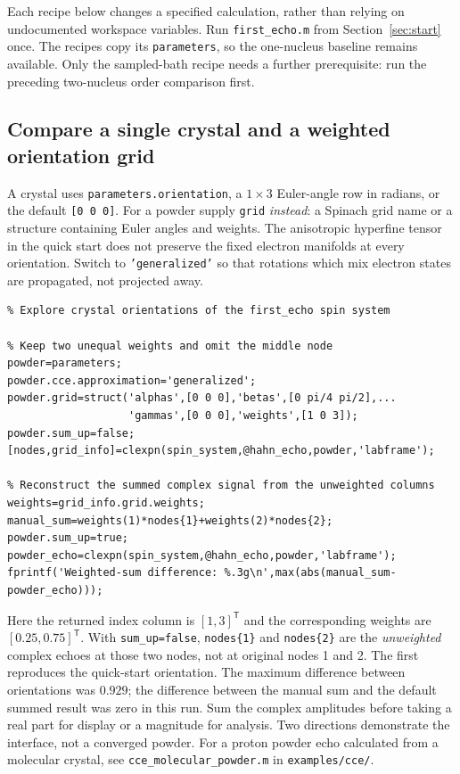 \documentclass[11pt,a4paper]{article}
\newcommand{\code}[1]{\texttt{#1}}
\begin{document}
Each recipe below changes a specified calculation, rather than relying on undocumented workspace variables. Run \code{first\_echo.m} from Section~\ref{sec:start} once. The recipes copy its \code{parameters}, so the one-nucleus baseline remains available. Only the sampled-bath recipe needs a further prerequisite: run the preceding two-nucleus order comparison first.

\subsection{Compare a single crystal and a weighted orientation grid}
A crystal uses \code{parameters.orientation}, a $1\times3$ Euler-angle row in radians, or the default \code{[0 0 0]}. For a powder supply \code{grid} \emph{instead}: a Spinach grid name or a structure containing Euler angles and weights. The anisotropic hyperfine tensor in the quick start does not preserve the fixed electron manifolds at every orientation. Switch to \code{'generalized'} so that rotations which mix electron states are propagated, not projected away.
\begin{lstlisting}
% Explore crystal orientations of the first_echo spin system

% Keep two unequal weights and omit the middle node
powder=parameters;
powder.cce.approximation='generalized';
powder.grid=struct('alphas',[0 0 0],'betas',[0 pi/4 pi/2],...
                   'gammas',[0 0 0],'weights',[1 0 3]);
powder.sum_up=false;
[nodes,grid_info]=clexpn(spin_system,@hahn_echo,powder,'labframe');

% Reconstruct the summed complex signal from the unweighted columns
weights=grid_info.grid.weights;
manual_sum=weights(1)*nodes{1}+weights(2)*nodes{2};
powder.sum_up=true;
powder_echo=clexpn(spin_system,@hahn_echo,powder,'labframe');
fprintf('Weighted-sum difference: %.3g\n',max(abs(manual_sum-powder_echo)));
\end{lstlisting}
Here the returned index column is $[1,3]^{\mathsf T}$ and the corresponding weights are $[0.25,0.75]^{\mathsf T}$. With \code{sum\_up=false}, \code{nodes\{1\}} and \code{nodes\{2\}} are the \emph{unweighted} complex echoes at those two nodes, not at original nodes 1 and 2. The first reproduces the quick-start orientation. The maximum difference between orientations was $0.929$; the difference between the manual sum and the default summed result was zero in this run. Sum the complex amplitudes before taking a real part for display or a magnitude for analysis. Two directions demonstrate the interface, not a converged powder. For a proton powder echo calculated from a molecular crystal, see \code{cce\_molecular\_powder.m} in \code{examples/cce/}.
\end{document}

